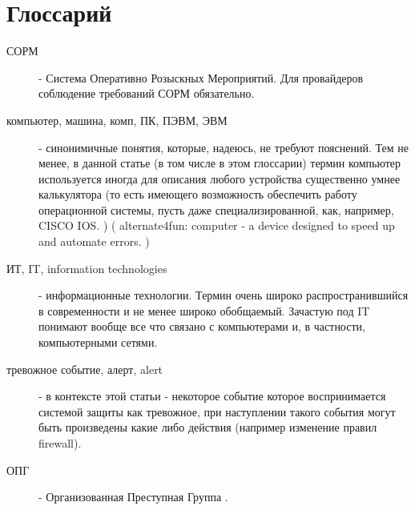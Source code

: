 \section{Глоссарий}
\label{glossary}

\begin{description}

\item[СОРМ]
- Система Оперативно Розыскных Мероприятий. Для провайдеров соблюдение требований СОРМ обязательно.

\item[ компьютер, машина, комп, ПК, ПЭВМ, ЭВМ ]
 - синонимичные понятия, которые,
надеюсь, не требуют пояснений. Тем не менее, в данной статье (в том числе в этом
глоссарии) термин компьютер
используется иногда для описания любого устройства существенно умнее калькулятора (то
есть имеющего возможность обеспечить работу операционной системы, пусть даже специализированной,
как, например, CISCO IOS. )
( alternate4fun: computer - a device designed to speed up and automate errors. )

\item[ИТ, IT, information technologies]
 - информационные технологии. Термин очень широко
распространившийся в современности и не менее широко обобщаемый. Зачастую под IT понимают
вообще все что связано с компьютерами и, в частности, компьютерными сетями.

\item[тревожное событие, алерт, alert]
- в контексте этой статьи - некоторое событие которое воспринимается системой защиты как тревожное,
при наступлении такого события могут быть произведены какие либо действия (например изменение правил firewall).

\item[ОПГ]
- Организованная Преступная Группа .


\end{description}
